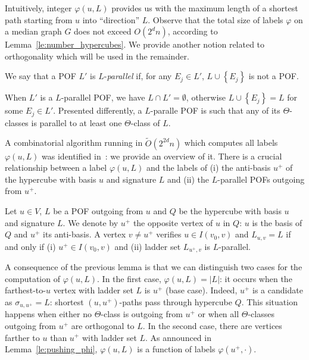\documentclass[a4paper,UKenglish,numberwithinsect,cleveref, autoref,anonymous]{lipics-v2021}
\newcommand{\set}[1]{\left\{ #1 \right\}}
\newcommand{\card}[1]{\left| #1 \right|}
\begin{document}
Intuitively, integer $\varphi(u,L)$ provides us with the maximum length of a shortest path starting from $u$ into ``direction'' $L$. Observe that the total size of labels $\varphi$ on a median graph $G$ does not exceed $O(2^dn)$, according to Lemma~\ref{le:number_hypercubes}. We provide another notion related to orthogonality which will be used in the remainder.

\begin{definition}[$L$-parallelism]
We say that a POF $L'$ is $L$-\emph{parallel} if, for any $E_j \in L'$, $L \cup \set{E_j}$ is not a POF.
\label{def:pof_parallel}
\end{definition}

When $L'$ is a $L$-parallel POF, we have $L \cap L' = \emptyset$, otherwise $L \cup \set{E_j} = L$ for some $E_j \in L'$. Presented differently, a $L$-paralle POF is such that any of its $\Theta$-classes is parallel to at least one $\Theta$-class of $L$.

A combinatorial algorithm running in $\tilde{O}(2^{2d}n)$ which computes all labels $\varphi(u,L)$ was identified in~\cite{BeHa21}: we provide an overview of it. There is a crucial relationship between a label $\varphi(u,L)$ and the labels of (i) the anti-basis $u^+$ of the hypercube with basis $u$ and signature $L$ and (ii) the $L$-parallel POFs outgoing from $u^+$.

\begin{lemma}
Let $u \in V$, $L$ be a POF outgoing from $u$ and $Q$ be the hypercube with basis $u$ and signature $L$. We denote by $u^+$ the opposite vertex of $u$ in $Q$: $u$ is the basis of $Q$ and $u^+$ its anti-basis. A vertex $v\neq u^+$ verifies $u \in I(v_0,v)$ and $L_{u,v} = L$ if and only if (i) $u^+ \in I(v_0,v)$ and (ii) ladder set $L_{u^+,v}$ is $L$-parallel.
\label{le:pushing_phi}
\end{lemma}

A consequence of the previous lemma is that we can distinguish two cases for the computation of $\varphi(u,L)$. In the first case, $\varphi(u,L) = \card{L}$: it occurs when the farthest-to-$u$ vertex with ladder set $L$ is $u^+$ (base case). Indeed, $u^+$ is a candidate as $\sigma_{u,u^+} = L$: shortest $(u,u^+)$-paths pass through hypercube $Q$. This situation happens when either no $\Theta$-class is outgoing from $u^+$ or when all $\Theta$-classes outgoing from $u^+$ are orthogonal to $L$. In the second case, there are vertices farther to $u$ than $u^+$ with ladder set $L$. As announced in Lemma~\ref{le:pushing_phi}, $\varphi(u,L)$ is a function of labels $\varphi(u^+,\cdot)$.
\end{document}
